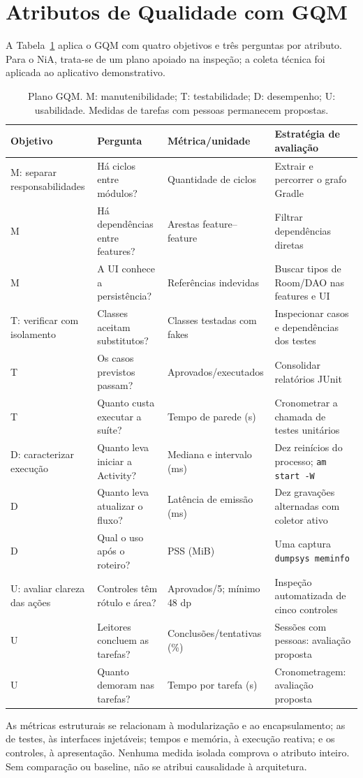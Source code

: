 \section{Atributos de Qualidade com GQM}\label{sec:gqm}
A Tabela~\ref{tab:gqm} aplica o GQM com quatro objetivos e três perguntas
por atributo. Para o NiA, trata-se de um plano
apoiado na inspeção; a coleta técnica foi aplicada ao aplicativo demonstrativo.

\begin{table}[t]
\caption{Plano GQM. M: manutenibilidade; T: testabilidade; D: desempenho;
U: usabilidade. Medidas de tarefas com pessoas permanecem propostas.}
\label{tab:gqm}
\centering
\begin{tabularx}{\textwidth}{@{}lXXX@{}}
\toprule
Objetivo & Pergunta & Métrica/unidade & Estratégia de avaliação \\
\midrule
M: separar responsabilidades & Há ciclos entre módulos? & Quantidade de ciclos & Extrair e percorrer o grafo Gradle \\
M & Há dependências entre features? & Arestas feature--feature & Filtrar dependências diretas \\
M & A UI conhece a persistência? & Referências indevidas & Buscar tipos de Room/DAO nas features e UI \\
T: verificar com isolamento & Classes aceitam substitutos? & Classes testadas com fakes & Inspecionar casos e dependências dos testes \\
T & Os casos previstos passam? & Aprovados/executados & Consolidar relatórios JUnit \\
T & Quanto custa executar a suíte? & Tempo de parede (s) & Cronometrar a chamada de testes unitários \\
D: caracterizar execução & Quanto leva iniciar a Activity? & Mediana e intervalo (ms) & Dez reinícios do processo; \texttt{am start -W} \\
D & Quanto leva atualizar o fluxo? & Latência de emissão (ms) & Dez gravações alternadas com coletor ativo \\
D & Qual o uso após o roteiro? & PSS (MiB) & Uma captura \texttt{dumpsys meminfo} \\
U: avaliar clareza das ações & Controles têm rótulo e área? & Aprovados/5; mínimo 48 dp & Inspeção automatizada de cinco controles \\
U & Leitores concluem as tarefas? & Conclusões/tentativas (\%) & Sessões com pessoas: avaliação proposta \\
U & Quanto demoram nas tarefas? & Tempo por tarefa (s) & Cronometragem: avaliação proposta \\
\bottomrule
\end{tabularx}
\end{table}

As métricas estruturais se relacionam à modularização e ao encapsulamento; as
de testes, às interfaces injetáveis; tempos e memória, à execução reativa; e
os controles, à apresentação. Nenhuma medida isolada comprova o atributo
inteiro. Sem comparação ou baseline, não se atribui causalidade à arquitetura.

